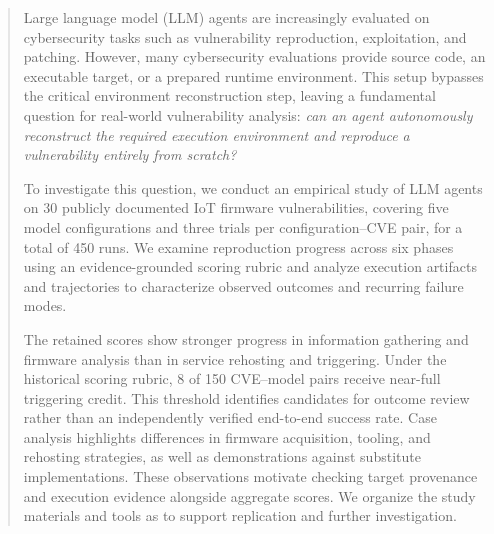 
\begin{abstract}
    Large language model (LLM) agents are increasingly evaluated on cybersecurity tasks such as vulnerability reproduction, exploitation, and patching. However, many cybersecurity evaluations provide source code, an executable target, or a prepared runtime environment. This setup bypasses the critical environment reconstruction step, leaving a fundamental question for real-world vulnerability analysis: \emph{can an agent autonomously reconstruct the required execution environment and reproduce a vulnerability entirely from scratch?}

    To investigate this question, we conduct an empirical study of LLM agents on 30 publicly documented IoT firmware vulnerabilities, covering five model configurations and three trials per configuration--CVE pair, for a total of 450 runs. We examine reproduction progress across six phases using an evidence-grounded scoring rubric and analyze execution artifacts and trajectories to characterize observed outcomes and recurring failure modes.

    The retained scores show stronger progress in information gathering and firmware analysis than in service rehosting and triggering. Under the historical scoring rubric, 8 of 150 CVE--model pairs receive near-full triggering credit. This threshold identifies candidates for outcome review rather than an independently verified end-to-end success rate. Case analysis highlights differences in firmware acquisition, tooling, and rehosting strategies, as well as demonstrations against substitute implementations. These observations motivate checking target provenance and execution evidence alongside aggregate scores. We organize the study materials and tools as \sys{} to support replication and further investigation.
\end{abstract}
